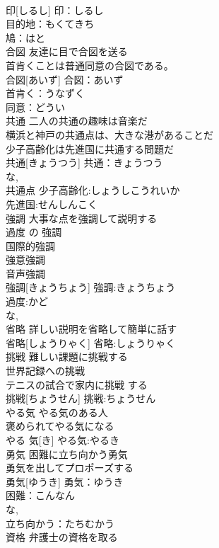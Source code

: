 \documentclass[8pt]{extreport}
\begin{document}
\begin{CJK}{UTF8}{min}
\\	印[しるし]			印：しるし
\\	目的地：もくてきち
\\	鳩：はと
\\	合図	友達に目で合図を送る 
\\	首肯くことは普通同意の合図である。 
\\	合図[あいず]			合図：あいず
\\	首肯く：うなずく
\\	同意：どうい 
\\	共通	二人の共通の趣味は音楽だ 
\\	横浜と神戸の共通点は、大きな港があることだ 
\\	少子高齢化は先進国に共通する問題だ 
\\	共通[きょうつう]			共通：きょうつう
\\	な, 
\\	共通点 少子高齢化:しょうしこうれいか
\\	先進国:せんしんこく
\\	強調	大事な点を強調して説明する 
\\	過度 の 強調 
\\	国際的強調 
\\	強意強調 
\\	音声強調 
\\	強調[きょうちょう]			強調:きょうちょう
\\	過度:かど
\\	な, 
\\	省略	詳しい説明を省略して簡単に話す 
\\	省略[しょうりゃく]			省略:しょうりゃく
\\	挑戦	難しい課題に挑戦する 
\\	世界記録への挑戦 
\\	テニスの試合で家内に挑戦 する 
\\	挑戦[ちょうせん]			挑戦:ちょうせん
\\	やる気	やる気のある人 
\\	褒められてやる気になる 
\\	やる 気[き]			やる気:やるき
\\	勇気	困難に立ち向かう勇気 
\\	勇気を出してプロポーズする 
\\	勇気[ゆうき]			勇気：ゆうき
\\	困難：こんなん
\\	な, 
\\	立ち向かう：たちむかう
\\	資格	弁護士の資格を取る 

\end{CJK}
\end{document}
